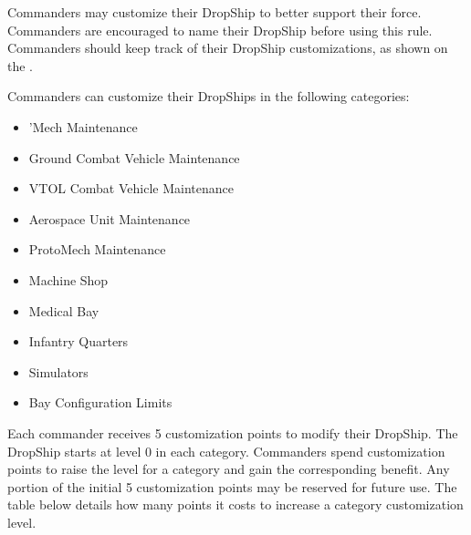 Commanders may customize their DropShip to better support their force.
Commanders are encouraged to name their DropShip before using this rule.
Commanders should keep track of their DropShip customizations, as shown on the .

Commanders can customize their DropShips in the following categories:


\begin{itemize}

\item 'Mech Maintenance

\item Ground Combat Vehicle Maintenance

\item VTOL Combat Vehicle Maintenance

\item Aerospace Unit Maintenance

\item ProtoMech Maintenance

\item Machine Shop

\item Medical Bay

\item Infantry Quarters

\item Simulators

\item Bay Configuration Limits

\end{itemize}


Each commander receives 5 customization points to modify their DropShip.
The DropShip starts at level 0 in each category.
Commanders spend customization points to raise the level for a category and gain the corresponding benefit.
Any portion of the initial 5 customization points may be reserved for future use.
The table below details how many points it costs to increase a category customization level.

